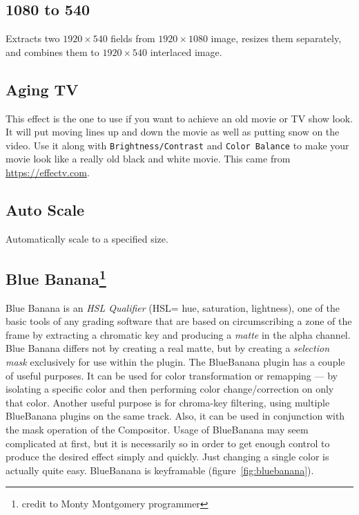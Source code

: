 \subsection{1080 to 540}%
\label{sub:1080_to_540}

Extracts two $1920\times540$ fields from $1920\times1080$ image, resizes them separately, and combines them to $1920\times540$ interlaced image.

\subsection{Aging TV}%
\label{sub:aging_tv}

This effect is the one to use if you want to achieve an old movie or TV show look. It will put moving lines up and down the movie as well as putting snow on the video. Use it along with \texttt{Brightness/Contrast} and \texttt{Color Balance} to make your movie look like a really old black and white movie. This came from \url{https://effectv.com}.

\subsection{Auto Scale}%
\label{sub:auto_scale}

Automatically scale to a specified size.

\subsection{Blue Banana\protect\footnote{credit to Monty Montgomery programmer}}%
\label{sub:blue_banana}

Blue Banana is an \textit{HSL Qualifier} (HSL= hue, saturation, lightness), one of the basic tools of any grading software that are based on circumscribing a zone of the frame by extracting a chromatic key and producing a \textit{matte} in the alpha channel. Blue Banana differs not by creating a real matte, but by creating a \textit{selection mask} exclusively for use within the plugin. The BlueBanana plugin has a couple of useful purposes. It can be used for color transformation or remapping --- by isolating a specific color and then performing color change/correction on only that color. Another useful purpose is for chroma-key filtering, using multiple BlueBanana plugins on the same track. Also, it can be used in conjunction with the mask operation of the Compositor. Usage of BlueBanana may seem complicated at first, but it is necessarily so in order to get enough control to produce the desired effect simply and quickly. Just changing a single color is actually quite easy. BlueBanana is keyframable (figure~\ref{fig:bluebanana}).


